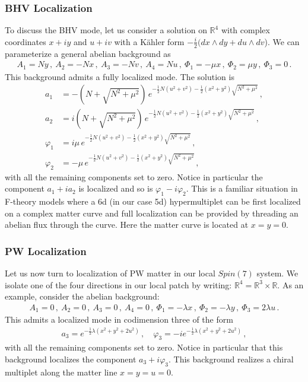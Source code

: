 \documentclass[12pt]{article}%
\numberwithin{equation}{section}
\newcommand{\al}[1]{\begin{align}#1\end{align}}
\renewcommand{\(}{\left(}
\renewcommand{\)}{\right)}
\renewcommand{\[}{\left[}
\renewcommand{\]}{\right]}
\begin{document}
\subsubsection{BHV Localization}

To discuss the BHV mode, let us consider a solution on $\mathbb{R}^4$ with complex coordinates $x+iy$ and $u+iv$ with a K\"ahler form $-\frac{i}{2}(dx\wedge dy+du\wedge dv$). We can parameterize a general abelian background as
%
\al{ A_1 = N y\,, \ A_2 = - N x\,, \ A_3 = - N v\,, \ A_4 = N u\,, \ \Phi_1 = -  \mu x\,, \ \Phi_2 = \mu y\,, \ \Phi_3 = 0\,.
}
%
This background admits a fully localized mode. The solution is
%
\al{ a_1 &= -\left( N + \sqrt{N^2 + \mu^2} \right)\,e^{-\frac{1}{2} N (u^2 + v^2) -\frac{1}{2} (x^2 + y^2 ) \sqrt{N^2 + \mu^2}}\,,\\
 a_2 &= i \left( N + \sqrt{N^2 + \mu^2} \right)\,e^{-\frac{1}{2} N (u^2 + v^2) -\frac{1}{2} (x^2 + y^2 ) \sqrt{N^2 + \mu^2}}\,,\\
  \varphi_1 &= i \mu \,e^{-\frac{1}{2} N (u^2 + v^2) -\frac{1}{2} (x^2 + y^2 ) \sqrt{N^2 + \mu^2}}\,,\\
    \varphi_2 &=- \mu \,e^{-\frac{1}{2} N (u^2 + v^2) -\frac{1}{2} (x^2 + y^2 ) \sqrt{N^2 + \mu^2}}\,,
}
%
with all the remaining components set to zero. Notice in particular the component $a_1 + i a_2 $ is localized and so is $\varphi_1 - i \varphi_2$. This is a familiar situation in F-theory models  \cite{Beasley:2008dc, Beasley:2008kw, Heckman:2008qa, Font:2012wq, Font:2013ida} where a 6d (in our case 5d) hypermultiplet can be first localized on a complex matter curve and full localization can be provided by threading an abelian flux through the curve. Here the matter curve is located at $x=y=0$.

\subsubsection{PW Localization}

Let us now turn to localization of PW matter in our local $Spin(7)$ system.
We isolate one of the four directions in our local patch by writing: $\mathbb{R}^4=\mathbb{R}^3\times \mathbb{R}$.
As an example, consider the abelian background:
%
\al{ A_1 = 0\,, \ A_2 =  0\,, \ A_3 = 0\,, \ A_4 =0\,,  \ \Phi_1 = -\lambda x\,, \ \Phi_2 = -\lambda y\,, \ \Phi_3 = 2 \lambda u\,.
}
%
This admits a localized mode in codimension three of the form
%
\al{ a_3 = e^{- \frac{1}{2}\lambda \left(x^2 + y^2 + 2 u^2 \right)}\,, \quad \varphi_3 = -i e^{- \frac{1}{2}\lambda \left(x^2 + y^2 + 2 u^2 \right)}\,,
}
%
with all the remaining components set to zero. Notice in particular that this background localizes the component $a_3 + i \varphi_3$.
This background realizes a chiral multiplet along the matter line $x=y=u=0$.
\end{document}
